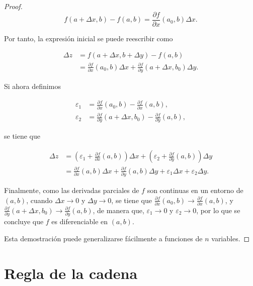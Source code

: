 \documentclass[
  a4paper,
]{scrreport}
\theoremstyle{plain}
\theoremstyle{plain}
\theoremstyle{definition}
\theoremstyle{definition}
\theoremstyle{plain}
\theoremstyle{definition}
\theoremstyle{remark}
\begin{document}
\begin{tcolorbox}
\begin{proof}
\[
f(a+\Delta x, b) - f(a,b) = \frac{\partial f}{\partial x}(a_0, b) \Delta x.
\]

Por tanto, la expresión inicial se puede reescribir como

\begin{align*}
\Delta z 
&= f(a+\Delta x, b+\Delta y) - f(a,b) \\
&= \frac{\partial f}{\partial x}(a_0, b) \Delta x + \frac{\partial f}{\partial y}(a+\Delta x, b_0) \Delta y.
\end{align*}

Si ahora definimos

\begin{align*}
\varepsilon_1 &= \frac{\partial f}{\partial x}(a_0,b)-\frac{\partial f}{\partial x}(a,b),\\
\varepsilon_2 &= \frac{\partial f}{\partial y}(a+\Delta x, b_0)-\frac{\partial f}{\partial y}(a,b),
\end{align*}

se tiene que

\begin{align*}
\Delta z 
&=
\left(\varepsilon_1 + \frac{\partial f}{\partial x}(a, b)\right)\Delta x + \left(\varepsilon_2 + \frac{\partial f}{\partial y}(a, b)\right)\Delta y \\
&= \frac{\partial f}{\partial x}(a, b)\Delta x + \frac{\partial f}{\partial y}(a, b)\Delta y + \varepsilon_1\Delta x + \varepsilon_2\Delta y.
\end{align*}

Finalmente, como las derivadas parciales de \(f\) son continuas en un
entorno de \((a,b)\), cuando \(\Delta x\to 0\) y \(\Delta y\to 0\), se
tiene que
\(\frac{\partial f}{\partial x}(a_0,b)\to \frac{\partial f}{\partial x}(a,b)\),
y
\(\frac{\partial f}{\partial y}(a+\Delta x, b_0)\to \frac{\partial f}{\partial y}(a,b)\),
de manera que, \(\varepsilon_1\to 0\) y \(\varepsilon_2\to 0\), por lo
que se concluye que \(f\) es diferenciable en \((a,b)\).

Esta demostración puede generalizarse fácilmente a funciones de \(n\)
variables.

\end{proof}

\end{tcolorbox}

\hypertarget{regla-de-la-cadena-2}{%
\section{Regla de la cadena}\label{regla-de-la-cadena-2}}
\end{document}
